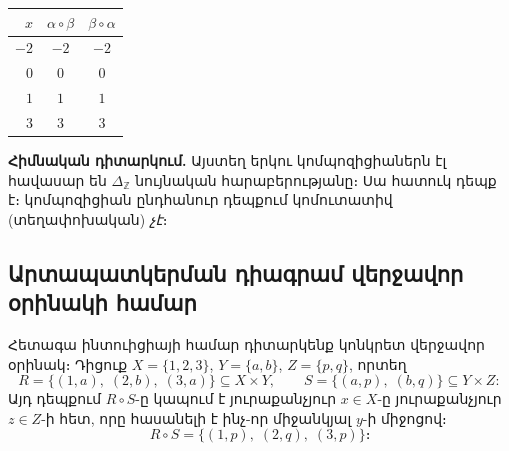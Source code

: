 \documentclass[12pt, a4paper]{article}
\newcommand{\Z}{\mathbb{Z}}
\begin{document}
\begin{center}
\renewcommand{\arraystretch}{1.1}
\begin{tabular}{r c c}
  \toprule
  $x$ & $\alpha \circ \beta$ & $\beta \circ \alpha$ \\
  \midrule
  $-2$ & $-2$ & $-2$ \\
  $0$  & $0$  & $0$  \\
  $1$  & $1$  & $1$  \\
  $3$  & $3$  & $3$  \\
  \bottomrule
\end{tabular}
\end{center}

\textbf{Հիմնական դիտարկում.} Այստեղ երկու կոմպոզիցիաներն էլ հավասար են $\Delta_{\Z}$ նույնական հարաբերությանը։ Սա հատուկ դեպք է։ կոմպոզիցիան ընդհանուր դեպքում կոմուտատիվ (տեղափոխական) \emph{չէ}։

\begin{center}
\end{center}

\subsection*{Արտապատկերման դիագրամ վերջավոր օրինակի համար}

Հետագա ինտուիցիայի համար դիտարկենք կոնկրետ վերջավոր օրինակ։
Դիցուք $X = \{1,2,3\}$, $Y = \{a,b\}$, $Z = \{p,q\}$, որտեղ
\[
  R = \{(1,a),\;(2,b),\;(3,a)\} \subseteq X \times Y,
  \qquad
  S = \{(a,p),\;(b,q)\} \subseteq Y \times Z:
\]
Այդ դեպքում $R \circ S$-ը կապում է յուրաքանչյուր $x \in X$-ը յուրաքանչյուր $z \in Z$-ի հետ, որը հասանելի է ինչ-որ միջանկյալ $y$-ի միջոցով։
\[
  \boxed{R \circ S = \{(1,p),\;(2,q),\;(3,p)\}։}
\]
\end{document}
